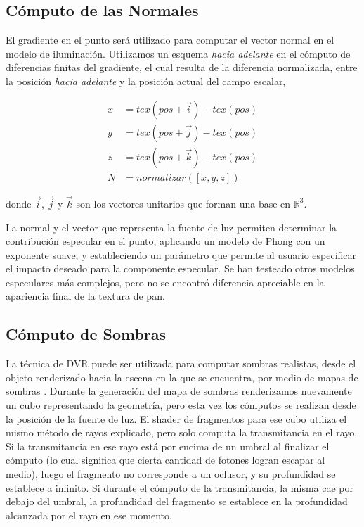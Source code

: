 \subsection{Cómputo de las Normales}
El gradiente en el punto será utilizado para computar el vector normal en el modelo de iluminación.
Utilizamos un esquema {\em hacia adelante} en el cómputo de diferencias finitas del gradiente, el cual resulta de la diferencia normalizada, entre la posición {\em hacia adelante} y la posición actual del campo escalar,


\begin{equation}
\begin{aligned}
x &= tex(pos+\vec{i}) - tex(pos)\\
y &= tex(pos+\vec{j}) - tex(pos)\\
z &= tex(pos+\vec{k}) - tex(pos) \\
N &= normalizar([x,y,z])
\end{aligned}
\end{equation}

\noindent donde $\vec{i}$, $\vec{j}$ y $\vec{k}$ son los vectores unitarios que forman una base en $\mathbb{R}^{3}$.

La normal y el vector que representa la fuente de luz permiten determinar la contribución especular en el punto, aplicando un modelo de Phong con un exponente suave, y estableciendo un parámetro que permite al usuario especificar el impacto deseado para la componente especular.
Se han testeado otros modelos especulares más complejos, pero no se encontró diferencia apreciable en la apariencia final de la textura de pan.

\subsection{Cómputo de Sombras}
La técnica de DVR puede ser utilizada para computar sombras realistas, desde el objeto renderizado hacia la escena en la que se encuentra, por medio de mapas de sombras \cite{Williams1978}.
Durante la generación del mapa de sombras renderizamos nuevamente un cubo representando la geometría, pero esta vez los cómputos se realizan desde la posición de la fuente de luz.
El shader de fragmentos para ese cubo utiliza el mismo método de rayos explicado, pero solo computa la transmitancia en el rayo.
Si la transmitancia en ese rayo está por encima de un umbral al finalizar el cómputo (lo cual significa que cierta cantidad de fotones logran escapar al medio), luego el fragmento no corresponde a un oclusor, y su profundidad se establece a infinito.
Si durante el cómputo de la transmitancia, la misma cae por debajo del umbral, la profundidad del fragmento se establece en la profundidad alcanzada por el rayo en ese momento.

